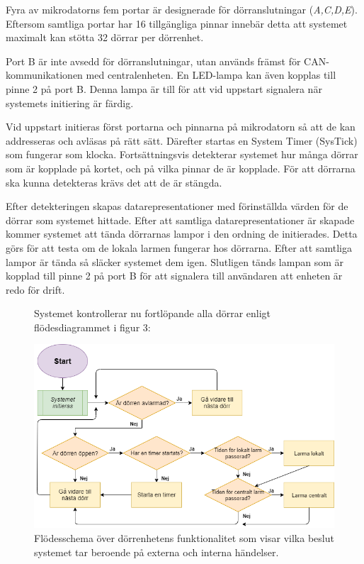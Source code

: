 \documentclass{article}
\begin{document}
Fyra av mikrodatorns fem portar är designerade för dörranslutningar (\textit{A,C,D,E}). \\ 
Eftersom samtliga portar har 16 tillgängliga pinnar innebär detta att systemet maximalt kan stötta 32 dörrar per dörrenhet.

Port B är inte avsedd för dörranslutningar, utan används främst för CAN-\\kommunikationen 
med centralenheten. En LED-lampa kan även kopplas till \\ pinne 2 på port B. Denna lampa är till för att vid uppstart signalera när systemets initiering är färdig.

Vid uppstart initieras först portarna och pinnarna på mikrodatorn så att de kan addresseras 
och avläsas på rätt sätt. Därefter startas en System Timer (SysTick) som fungerar som klocka. 
Fortsättningsvis detekterar systemet hur många dörrar som är kopplade på kortet, och på vilka 
pinnar de är kopplade. För att dörrarna ska kunna detekteras krävs det att de är stängda.

Efter detekteringen skapas datarepresentationer med förinställda värden för de dörrar som systemet 
hittade. Efter att samtliga datarepresentationer är skapade kommer systemet att tända dörrarnas lampor 
i den ordning de initierades. Detta görs för att testa om de lokala larmen fungerar hos dörrarna. Efter att samtliga lampor är tända så släcker systemet dem igen.
Slutligen tänds lampan som är kopplad till pinne 2 på port B för att signalera till användaren att enheten är redo för drift.
\newpage

\begin{figure}
\begin{flushleft}
Systemet kontrollerar nu fortlöpande alla dörrar enligt flödesdiagrammet i figur 3: \linebreak \newline
\end{flushleft} 
\centering
\includegraphics[scale=0.5]{figurer/Flow-Chart.png}
\caption{Flödesschema över dörrenhetens funktionalitet som visar vilka beslut systemet tar beroende på externa och interna händelser.}
\end{figure}
\end{document}
